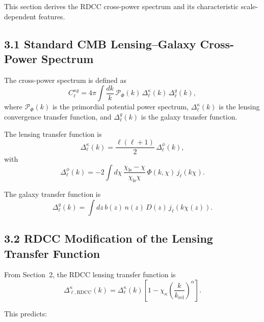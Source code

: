 \documentclass[11pt,a4paper]{article}
\begin{document}
This section derives the RDCC cross-power spectrum and its characteristic scale-dependent 
features.

\subsection*{3.1 Standard CMB Lensing–Galaxy Cross-Power Spectrum}

The cross-power spectrum is defined as
\begin{equation}
    C_{\ell}^{\kappa g}
    = 4\pi \int \frac{dk}{k}\,
      \mathcal{P}_{\Phi}(k)\,
      \Delta_{\ell}^{\kappa}(k)\,
      \Delta_{\ell}^{g}(k),
\end{equation}
where $\mathcal{P}_{\Phi}(k)$ is the primordial potential power spectrum, 
$\Delta_{\ell}^{\kappa}(k)$ is the lensing convergence transfer function, and 
$\Delta_{\ell}^{g}(k)$ is the galaxy transfer function.

The lensing transfer function is
\begin{equation}
    \Delta_{\ell}^{\kappa}(k)
    = \frac{\ell(\ell+1)}{2}\,
      \Delta_{\ell}^{\phi}(k),
\end{equation}
with
\begin{equation}
    \Delta_{\ell}^{\phi}(k)
    = -2 \int d\chi\,
      \frac{\chi_{\mathrm{ls}}-\chi}{\chi_{\mathrm{ls}}\chi}\,
      \Phi(k,\chi)\,
      j_{\ell}(k\chi).
\end{equation}

The galaxy transfer function is
\begin{equation}
    \Delta_{\ell}^{g}(k)
    = \int dz\,
      b(z)\,n(z)\,D(z)\,
      j_{\ell}(k\chi(z)).
\end{equation}

\subsection*{3.2 RDCC Modification of the Lensing Transfer Function}

From Section~2, the RDCC lensing transfer function is
\begin{equation}
    \Delta_{\ell,\mathrm{RDCC}}^{\kappa}(k)
    = \Delta_{\ell}^{\kappa}(k)
      \left[
        1 - \chi_{\kappa}
        \left(\frac{k}{k_{\mathrm{rel}}}\right)^{\alpha}
      \right].
\end{equation}

This predicts:
\end{document}
